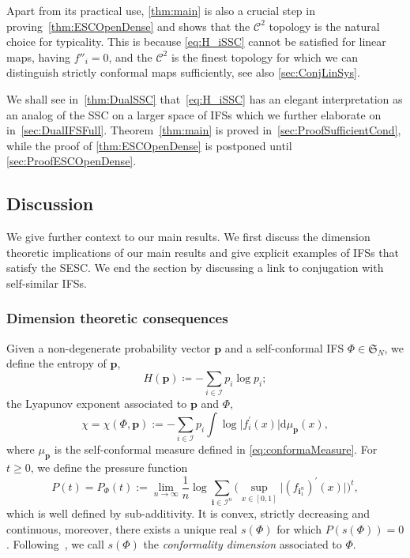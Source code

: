 \documentclass[12pt,]{article}
\def\cref#1{\ref{#1}}%
\theoremstyle{definition}
\theoremstyle{remark}
\newcommand{\0}{\mathbf{0}}
\newcommand{\bi}{\mathbf{i}}
\begin{document}
Apart from its practical use, \cref{thm:main} is also a crucial step in
proving~\cref{thm:ESCOpenDense} and shows that the $\mathcal{C}^2$ topology
is the natural choice for typicality.
This is because \cref{eq:H_iSSC} cannot be satisfied for linear maps, having $f''_i =0$, and the $\mathcal{C}^2$
is the finest topology for which we can distinguish strictly conformal maps sufficiently, see also
\cref{sec:ConjLinSys}.

We shall see in~\cref{thm:DualSSC} that~\cref{eq:H_iSSC} has an elegant interpretation as an analog
of the SSC on a larger space of IFSs which we further elaborate on in~\cref{sec:DualIFSFull}. 
Theorem~\ref{thm:main} is proved in~\cref{sec:ProofSufficientCond}, while the proof of
\cref{thm:ESCOpenDense} is postponed until \cref{sec:ProofESCOpenDense}.

\subsection{Discussion}
We give further context to our main results. We first discuss the dimension theoretic implications
of our main results and  give explicit examples of IFSs that satisfy the SESC. We end the section by
discussing a link to conjugation with self-similar IFSs.

\subsubsection{Dimension theoretic consequences}
Given a non-degenerate probability vector $\mathbf{p}$ and a self-conformal IFS $\Phi\in
\mathfrak{S}_N$, we define the entropy of $\mathbf{p}$,
\begin{equation*}
H(\mathbf{p})\coloneqq -\sum_{i\in\mathcal{I}} p_i\log p_i;
\end{equation*}
the Lyapunov exponent associated to $\mathbf{p}$ and $\Phi$,
\begin{equation*}
\chi=\chi(\Phi,\mathbf{p}):=-\sum_{i \in \mathcal{I}} p_i \int \log \big|f_{i}^{'}(x)\big|
\mathrm{d} \mu_{\mathbf{p}}(x),
\end{equation*}
where $\mu_{\mathbf{p}}$ is the self-conformal measure defined in \cref{eq:conformaMeasure}.
For $t\geq 0$, we define the pressure function
\begin{equation*}
P(t)=P_{\Phi}(t):=\lim _{n \rightarrow \infty} \frac{1}{n} \log \sum_{\bi \in
\mathcal{I}^n} \Big(\sup_{x\in[0,1]} \big|(f_{\bi_1^n})^{\prime}(x)\big|\Big)^t,
\end{equation*}
which is well defined by sub-additivity. It is convex, strictly decreasing and continuous, moreover,
there exists a unique real $s(\Phi)$ for which $P(s(\Phi))=0$.
Following~\cite[Chapter~14]{BaranySimonSolomyak_Book23}, we call $s(\Phi)$ the \emph{conformality
dimension} associated to $\Phi$. 
\end{document}
